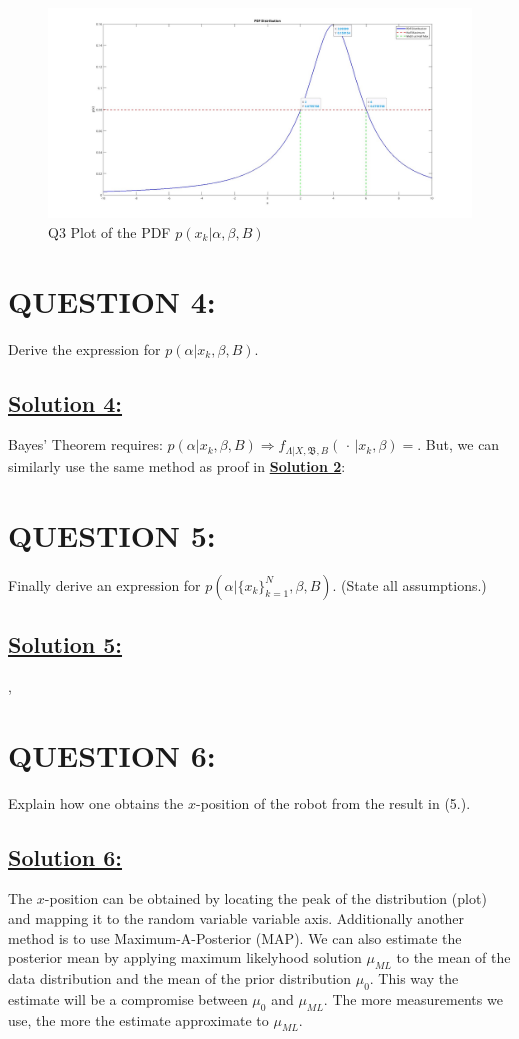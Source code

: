 \documentclass[a4paper,11pt]{article}
\begin{document}
\begin{figure}
        \centering
        \includegraphics[scale=0.16]{q03pdfplot.jpg} 
        \caption{Q3 Plot of the PDF $p(x_k | \alpha, \beta, B)$}
\end{figure}


\section{QUESTION 4:}
Derive the expression for $p(\alpha | x_k, \beta, B)$.

\subsection*{\underline{Solution 4:}}
Bayes' Theorem requires: $p(\alpha | x_k, \beta, B) \Rightarrow f_{\Lambda | X, \mathfrak{B},B} (\, \cdot \, | x_k, \beta) = $. But, we can similarly use the same method as proof in \hyperref[sec:proof]{\textbf{Solution 2}}:

\section{QUESTION 5:}
Finally derive an expression for $p(\alpha | \{x_k\}^N _{k = 1}, \beta, B)$. (State all assumptions.)

\subsection*{\underline{Solution 5:}}
,

\section{QUESTION 6:}
Explain how one obtains the $x$-position of the robot from the result in (5.).

\subsection*{\underline{Solution 6:}}
The $x$-position can be obtained by locating the peak of the distribution (plot) and mapping it to the random variable variable axis. Additionally another method is to use Maximum-A-Posterior (MAP). We can also estimate the posterior mean by applying maximum likelyhood solution $\mu_{ML}$ to the mean of the data distribution and the mean of the prior distribution $\mu_0$. This way the estimate will be a compromise between $\mu_0$ and $\mu_{ML}$. The more measurements we use, the more the estimate approximate to $\mu_{ML}$.
\end{document}
